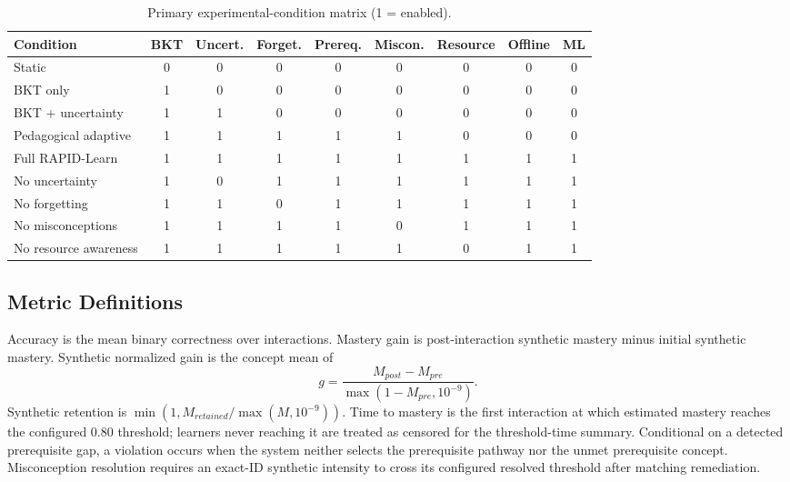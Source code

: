 \documentclass[conference]{IEEEtran}
\begin{document}
\begin{table}[t]
\caption{Primary experimental-condition matrix (1 = enabled).}
\label{tab:conditions}
\centering
\scriptsize
\begin{tabular}{lcccccccc}
\hline
\textbf{Condition} & \textbf{BKT} & \textbf{Uncert.} & \textbf{Forget.} &
\textbf{Prereq.} & \textbf{Miscon.} & \textbf{Resource} & \textbf{Offline} & \textbf{ML} \\
\hline
Static & 0&0&0&0&0&0&0&0\\
BKT only & 1&0&0&0&0&0&0&0\\
BKT + uncertainty & 1&1&0&0&0&0&0&0\\
Pedagogical adaptive & 1&1&1&1&1&0&0&0\\
Full RAPID-Learn & 1&1&1&1&1&1&1&1\\
No uncertainty & 1&0&1&1&1&1&1&1\\
No forgetting & 1&1&0&1&1&1&1&1\\
No misconceptions & 1&1&1&1&0&1&1&1\\
No resource awareness & 1&1&1&1&1&0&1&1\\
\hline
\end{tabular}
\end{table}

\subsection{Metric Definitions}

Accuracy is the mean binary correctness over interactions. Mastery gain is
post-interaction synthetic mastery minus initial synthetic mastery. Synthetic
normalized gain is the concept mean of
\begin{equation}
g=\frac{M_{post}-M_{pre}}{\max(1-M_{pre},10^{-9})}.
\end{equation}
Synthetic retention is
$\min(1,M_{retained}/\max(M,10^{-9}))$. Time to mastery is the first
interaction at which estimated mastery reaches the configured 0.80 threshold;
learners never reaching it are treated as censored for the threshold-time
summary. Conditional on a detected prerequisite gap, a violation occurs when
the system neither selects the prerequisite pathway nor the unmet prerequisite
concept. Misconception resolution requires an exact-ID synthetic intensity to
cross its configured resolved threshold after matching remediation.
\end{document}
